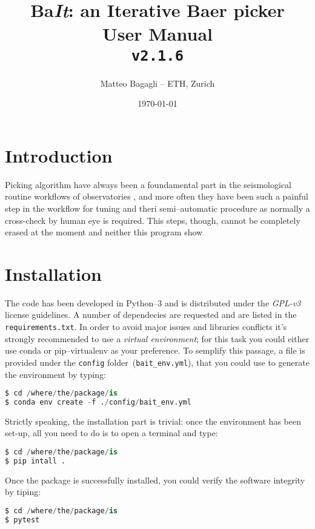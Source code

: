 \documentclass[11pt,a4paper,twocolumns]{article}
\title{\textbf{Ba\textit{It}: an Iterative Baer picker \\ User Manual \\ \texttt{v2.1.6}}}
\author{Matteo Bagagli -- ETH, Zurich}
\date{\today}
\begin{document}
\newcommand{\bait}{\textbf{Ba}\textit{It} }


\maketitle
\tableofcontents
\section{Introduction}
Picking algorithm have always been a foundamental part in the seismological routine workflows of observatories  ,
and more often they have been such a painful step in the workflow for
tuning and theri semi--automatic procedure as normally a cross-check by human eye is required.
This steps, though, cannot be completely erased at the moment and neither this program
show


\section{Installation}
The code has been developed in Python--3 and is distributed under the \emph{GPL-v3} license guidelines. 
A number of dependecies are requested and are listed in the \texttt{requirements.txt}. In order to avoid major issues and libraries conflicts it's strongly recommended to use a \emph{virtual environment}; for this task you could either use conda or pip--virtualenv as your preference.
To semplify this passage, a file is provided under the \texttt{config} folder~(\texttt{bait\_env.yml}), that you could use to generate the environment by typing:
\begin{lstlisting}[language=Python]
$ cd /where/the/package/is
$ conda env create -f ./config/bait_env.yml
\end{lstlisting}

Strictly speaking, the installation part is trivial: once the environment has been set-up, all you need to do is to open a terminal and type:
\begin{lstlisting}[language=Python]
$ cd /where/the/package/is
$ pip intall .
\end{lstlisting}

Once the package is successfully installed, you could verify the software integrity by tiping:
\begin{lstlisting}[language=Python]
$ cd /where/the/package/is
$ pytest
\end{lstlisting}
\end{document}

